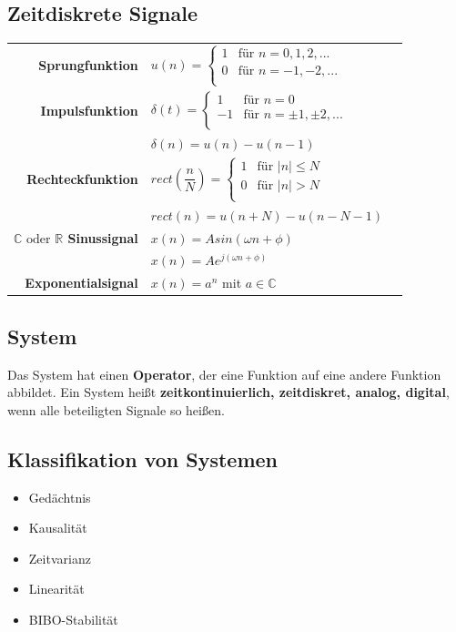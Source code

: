 \documentclass[10pt,a4paper]{article}
\begin{document}
\subsection*{Zeitdiskrete Signale}
\begin{tabular}{r>{\centering\arraybackslash}p{6cm}l}
	\textbf{Sprungfunktion} & $u(n)=\begin{cases}
	1 & \text{für } n=0,1,2,...\\
	0 & \text{für } n=-1,-2,...\\
	\end{cases}$ & \\
	\textbf{Impulsfunktion} & $\delta(t)=\begin{cases}
	1 & \text{für } n=0\\
	-1 & \text{für } n=\pm1,\pm2,...\\
	\end{cases}$ & \\ 
	& $\delta(n) = u(n)-u(n-1)$&\\
	\textbf{Rechteckfunktion} & $rect(\dfrac{n}{N})=\begin{cases}
	1 & \text{für } \vert n\vert \leq N\\
	0 & \text{für } \vert n\vert > N\\
	\end{cases}$ & \\
	& $rect(n)= u(n+N)-u(n-N-1)$& \\
	\textbf{$\mathbb C \text{ oder } \mathbb R$ Sinussignal} & $x(n)=Asin(\omega n+ \phi)$& \\
	& $x(n)=Ae^{j(\omega n + \phi)}$ & \\
	\textbf{Exponentialsignal} & $x(n)=a^{n}$ mit $a \in \mathbb C$&\\
	\end{tabular} 
\subsection*{System}
	Das System hat einen \textbf{Operator}, der eine Funktion auf eine andere Funktion abbildet. Ein System heißt \textbf{zeitkontinuierlich, zeitdiskret, analog, digital}, wenn alle beteiligten Signale so heißen.
\subsection*{Klassifikation von Systemen}
\begin{itemize}
	\item Gedächtnis
	\item Kausalität
	\item Zeitvarianz
	\item Linearität
	\item BIBO-Stabilität
\end{itemize}
\end{document}
